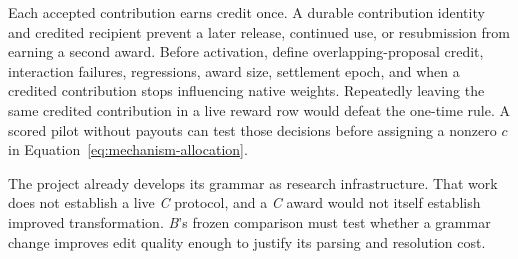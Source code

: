 Each accepted contribution earns credit once. A durable contribution identity
and credited recipient prevent a later release, continued use, or resubmission
from earning a second award. Before activation, define overlapping-proposal
credit, interaction failures, regressions, award size, settlement epoch, and
when a credited contribution stops influencing native weights. Repeatedly
leaving the same credited contribution in a live reward row would defeat the
one-time rule. A scored pilot without payouts can test those decisions before
assigning a nonzero \(c\) in Equation~\ref{eq:mechanism-allocation}.

The project already develops its grammar as research infrastructure. That work
does not establish a live \textit{C} protocol, and a \textit{C} award would not
itself establish improved transformation. \textit{B}'s frozen comparison must
test whether a grammar change improves edit quality enough to justify its
parsing and resolution cost.
